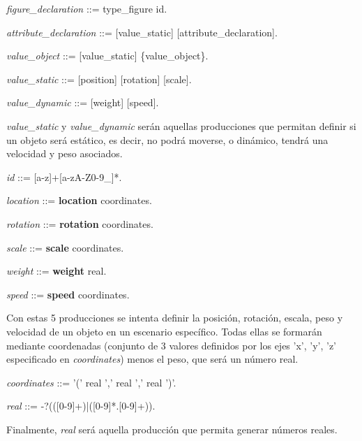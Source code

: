 \documentclass[12pt]{article}
\begin{document}
\noindent \textit{figure\_declaration} ::= type\_figure id.

\noindent \textit{attribute\_declaration} ::= [value\_static] [attribute\_declaration].

\noindent \textit{value\_object} ::= [value\_static] \{value\_object\}.

\noindent \textit{value\_static} ::= [position] [rotation] [scale].

\noindent \textit{value\_dynamic} ::= [weight] [speed].

\textit{value\_static} y \textit{value\_dynamic} serán aquellas producciones que permitan definir si un objeto será estático, es decir, no podrá moverse, o dinámico, tendrá una velocidad y peso asociados.

\noindent \textit{id} ::= [a-z]+[a-zA-Z0-9\_]*.

\noindent \textit{location} ::= \textbf{location} coordinates.

\noindent \textit{rotation} ::= \textbf{rotation} coordinates.

\noindent \textit{scale} ::=  \textbf{scale} coordinates.

\noindent \textit{weight} ::= \textbf{weight} real.

\noindent \textit{speed} ::= \textbf{speed} coordinates.

Con estas 5 producciones se intenta definir la posición, rotación, escala, peso y velocidad de un objeto en un escenario específico. Todas ellas se formarán mediante coordenadas (conjunto de 3 valores definidos por los ejes 'x', 'y', 'z' especificado en \textit{coordinates}) menos el peso, que será un número real.

\noindent \textit{coordinates} ::= '(' real ',' real ',' real ')'.

\noindent \textit{real} ::= -?(([0-9]+)|([0-9]*.[0-9]+)).

Finalmente, \textit{real} será aquella producción que permita generar números reales.

\newpage


\end{document}
